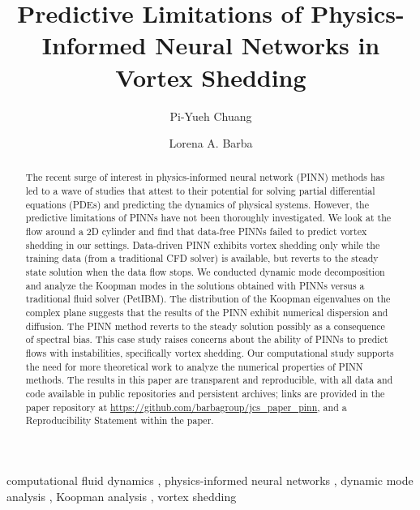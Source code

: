 \documentclass[5p, twocolumn, times, sort&compress]{elsarticle}
\begin{document}
    \begin{frontmatter}
        \title{%
        Predictive Limitations of Physics-Informed Neural Networks in Vortex Shedding%
        }

        \author[1]{Pi-Yueh Chuang}
        \author[1]{Lorena A. Barba}

        \begin{abstract}
            The recent surge of interest in physics-informed neural network (PINN) methods has led to a wave of studies that attest to their potential for solving partial differential equations (PDEs) and predicting the dynamics of physical systems. However, the predictive limitations of PINNs have not been thoroughly investigated. We look at the flow around a 2D cylinder and find that data-free PINNs failed to predict vortex shedding in our settings. Data-driven PINN exhibits vortex shedding only while the training data (from a traditional CFD solver) is available, but reverts to the steady state solution when the data flow stops. We conducted dynamic mode decomposition and analyze the Koopman modes in the solutions obtained with PINNs versus a traditional fluid solver (PetIBM). The distribution of the Koopman eigenvalues on the complex plane suggests that the results of the PINN exhibit numerical dispersion and diffusion. The PINN method  reverts to the steady solution possibly as a consequence of spectral bias. This case study raises concerns about the ability of PINNs to predict flows with instabilities, specifically vortex shedding. Our computational study supports the need for more theoretical work to analyze the numerical properties of PINN methods. The results in this paper are transparent and reproducible, with all data and code available in public repositories and persistent archives; links are provided in the paper repository at \url{https://github.com/barbagroup/jcs_paper_pinn}, and a Reproducibility Statement within the paper.
        \end{abstract}

        \begin{keyword}
            computational fluid dynamics \sep
            physics-informed neural networks \sep
            dynamic mode analysis \sep
            Koopman analysis \sep
            vortex shedding
        \end{keyword}
    \end{frontmatter}
\end{document}
